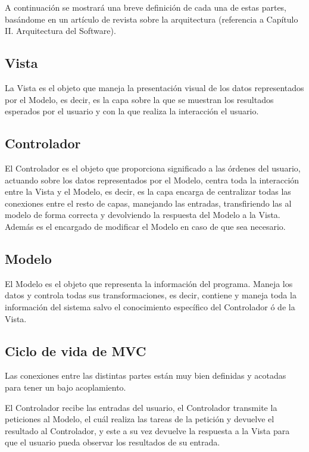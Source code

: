 A continuación se mostrará una breve definición de cada una de estas partes, basándome en un artículo de revista sobre la arquitectura (referencia a Capítulo II. Arquitectura del Software).

\subsection*{Vista}

La Vista es el objeto que maneja la presentación visual de los datos representados por el Modelo, es decir, es la capa sobre la que se muestran los resultados esperados por el usuario y con la que realiza la interacción el usuario.

\subsection*{Controlador}

El Controlador es el objeto que proporciona significado a las órdenes del usuario, actuando sobre los datos representados por el Modelo, centra toda la interacción entre la Vista y el Modelo, es decir, es la capa encarga de centralizar todas las conexiones entre el resto de capas, manejando las entradas, transfiriendo las al modelo de forma correcta y devolviendo la respuesta del Modelo a la Vista. Además es el encargado de modificar el Modelo en caso de que sea necesario.

\subsection*{Modelo}

El Modelo es el objeto que representa la información del programa. Maneja los datos y controla todas sus transformaciones, es decir, contiene y maneja toda la información del sistema salvo el conocimiento específico del Controlador ó de la Vista.

\subsection{Ciclo de vida de MVC}

Las conexiones entre las distintas partes están muy bien definidas y acotadas para tener un bajo acoplamiento.

El Controlador recibe las entradas del usuario, el Controlador transmite la peticiones al Modelo, el cuál realiza las tareas de la petición y devuelve el resultado al Controlador, y este a su vez devuelve la respuesta a la Vista para que el usuario pueda observar los resultados de su entrada.

